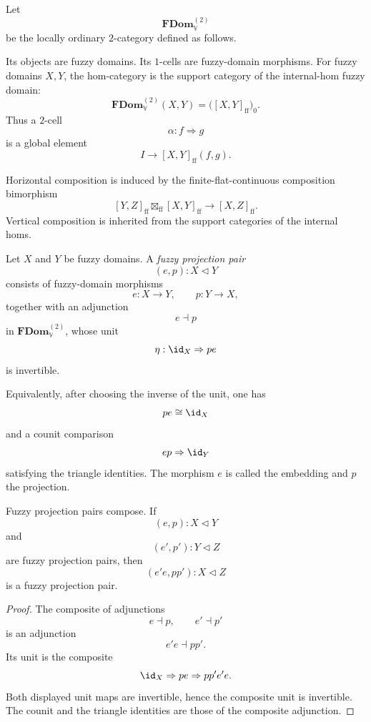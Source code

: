 \begin{definition}
\label{def:locally-ordinary-2-category-fdom}
Let
\[
    \mathbf{FDom}^{(2)}_{\mathbb V}
\]
be the locally ordinary \(2\)-category defined as follows.

Its objects are fuzzy domains.  Its \(1\)-cells are fuzzy-domain morphisms.
For fuzzy domains \(X,Y\), the hom-category is the support category of the
internal-hom fuzzy domain:
\[
    \mathbf{FDom}^{(2)}_{\mathbb V}(X,Y)
    =
    \bigl([X,Y]_{\mathrm{ff}}\bigr)_0.
\]
Thus a \(2\)-cell
\[
    \alpha:f\Rightarrow g
\]
is a global element
\[
    I\to [X,Y]_{\mathrm{ff}}(f,g).
\]

Horizontal composition is induced by the finite-flat-continuous composition
bimorphism
\[
    [Y,Z]_{\mathrm{ff}}\boxtimes_{\mathrm{ff}}[X,Y]_{\mathrm{ff}}
    \longrightarrow
    [X,Z]_{\mathrm{ff}}.
\]
Vertical composition is inherited from the support categories of the internal
homs.
\end{definition}

\begin{definition}
\label{def:fuzzy-projection-pair-ff}
Let \(X\) and \(Y\) be fuzzy domains.  A \emph{fuzzy projection pair}
\[
    (e,p):X\triangleleft Y
\]
consists of fuzzy-domain morphisms
\[
    e:X\to Y,
    \qquad
    p:Y\to X,
\]
together with an adjunction
\[
    e\dashv p
\]
in \(\mathbf{FDom}^{(2)}_{\mathbb V}\), whose unit
\[
    \eta:\id_X\Rightarrow pe
\]
is invertible.

Equivalently, after choosing the inverse of the unit, one has
\[
    pe\cong \id_X
\]
and a counit comparison
\[
    ep\Rightarrow \id_Y
\]
satisfying the triangle identities.  The morphism \(e\) is called the
embedding and \(p\) the projection.
\end{definition}

\begin{lemma}
\label{lem:composition-fuzzy-projection-pairs-ff}
Fuzzy projection pairs compose.  If
\[
    (e,p):X\triangleleft Y
\]
and
\[
    (e',p'):Y\triangleleft Z
\]
are fuzzy projection pairs, then
\[
    (e'e,pp'):X\triangleleft Z
\]
is a fuzzy projection pair.
\end{lemma}

\begin{proof}
The composite of adjunctions
\[
    e\dashv p,
    \qquad
    e'\dashv p'
\]
is an adjunction
\[
    e'e\dashv pp'.
\]
Its unit is the composite
\[
    \id_X
    \Rightarrow
    pe
    \Rightarrow
    pp'e'e.
\]
Both displayed unit maps are invertible, hence the composite unit is invertible.
The counit and the triangle identities are those of the composite adjunction.
\end{proof}

